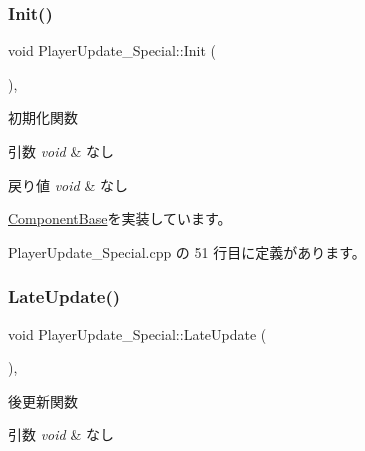 \subsubsection{\texorpdfstring{Init()}{Init()}}
{\footnotesize\ttfamily void Player\+Update\+\_\+\+Special\+::\+Init (\begin{DoxyParamCaption}{ }\end{DoxyParamCaption})\hspace{0.3cm}{\ttfamily [override]}, {\ttfamily [virtual]}}



初期化関数 


\begin{DoxyParams}{引数}
{\em void} & なし \\
\hline
\end{DoxyParams}

\begin{DoxyRetVals}{戻り値}
{\em void} & なし \\
\hline
\end{DoxyRetVals}


\mbox{\hyperlink{class_component_base_a125939d6befe42f28886a6523e86b18b}{Component\+Base}}を実装しています。



 Player\+Update\+\_\+\+Special.\+cpp の 51 行目に定義があります。

\mbox{\label{class_player_update___special_a1daae8fdcd87bf907313a98e022f254c}} 
\subsubsection{\texorpdfstring{Late\+Update()}{LateUpdate()}}
{\footnotesize\ttfamily void Player\+Update\+\_\+\+Special\+::\+Late\+Update (\begin{DoxyParamCaption}{ }\end{DoxyParamCaption})\hspace{0.3cm}{\ttfamily [override]}, {\ttfamily [virtual]}}



後更新関数 


\begin{DoxyParams}{引数}
{\em void} & なし \\
\hline
\end{DoxyParams}

